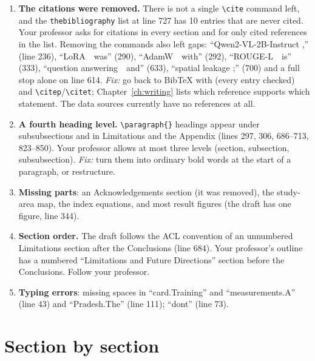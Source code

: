 \begin{enumerate}
  \item \textbf{The citations were removed.} There is not a single \texttt{\textbackslash cite} command left, and the \texttt{thebibliography} list at line 727 has 10 entries that are never cited. Your professor asks for citations in every section and for only cited references in the list. Removing the commands also left gaps: ``Qwen2-VL-2B-Instruct ,'' (line 236), ``LoRA\ \ was'' (290), ``AdamW\ \ with'' (292), ``ROUGE-L\ \ is'' (333), ``question answering\ \ and'' (633), ``spatial leakage ;'' (700) and a full stop alone on line 614. \emph{Fix:} go back to BibTeX with  (every entry checked) and \texttt{\textbackslash citep}/\texttt{\textbackslash citet}; Chapter~\ref{ch:writing} lists which reference supports which statement. The data sources currently have no references at all.
  \item \textbf{A fourth heading level.} \texttt{\textbackslash paragraph\{\}} headings appear under subsubsections and in Limitations and the Appendix (lines 297, 306, 686--713, 823--850). Your professor allows at most three levels (section, subsection, subsubsection). \emph{Fix:} turn them into ordinary bold words at the start of a paragraph, or restructure.
  \item \textbf{Missing parts}: an Acknowledgements section (it was removed), the study-area map, the index equations, and most result figures (the draft has one figure, line 344).
  \item \textbf{Section order.} The draft follows the ACL convention of an unnumbered Limitations section after the Conclusions (line 684). Your professor's outline has a numbered ``Limitations and Future Directions'' section before the Conclusions. Follow your professor.
  \item \textbf{Typing errors}: missing spaces in ``card.Training'' and ``measurements.A'' (line 43) and ``Pradesh.The'' (line 111); ``dont'' (line 73).
\end{enumerate}

\section{Section by section}


